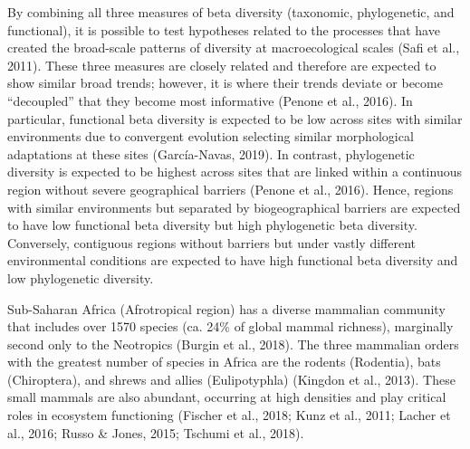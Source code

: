 \documentclass{article}
\begin{document}
\vspace{5mm}

By combining all three measures of beta diversity (taxonomic, phylogenetic, and functional), it is possible to test hypotheses related to the processes that have created the broad-scale patterns of diversity at macroecological scales (Safi et al., 2011). These three measures are closely related and therefore are expected to show similar broad trends; however, it is where their trends deviate or become “decoupled” that they become most informative (Penone et al., 2016). In particular, functional beta diversity is expected to be low across sites with similar environments due to convergent evolution selecting similar morphological adaptations at these sites (García-Navas, 2019). In contrast, phylogenetic diversity is expected to be highest across sites that are linked within a continuous region without severe geographical barriers (Penone et al., 2016). Hence, regions with similar environments but separated by biogeographical barriers are expected to have low functional beta diversity but high phylogenetic beta diversity. Conversely, contiguous regions without barriers but under vastly different environmental conditions are expected to have high functional beta diversity and low phylogenetic diversity. 

\vspace{5mm}

Sub-Saharan Africa (Afrotropical region) has a diverse mammalian community that includes over 1570 species (ca. 24\% of global mammal richness), marginally second only to the Neotropics (Burgin et al., 2018). The three mammalian orders with the greatest number of species in Africa are the rodents (Rodentia), bats (Chiroptera), and shrews and allies (Eulipotyphla) (Kingdon et al., 2013). These small mammals are also abundant, occurring at high densities and play critical roles in ecosystem functioning (Fischer et al., 2018; Kunz et al., 2011; Lacher et al., 2016; Russo \& Jones, 2015; Tschumi et al., 2018). 
\end{document}
